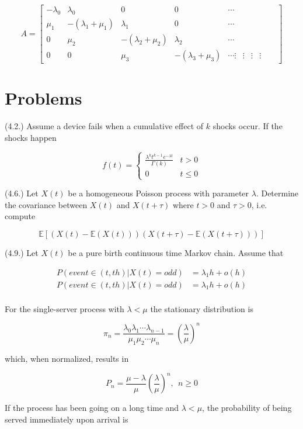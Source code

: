 \documentclass[12pt]{article}
\theoremstyle{nonumberbreak}
\begin{document}
$$
A = \begin{bmatrix}
-\lambda_0 & \lambda_0 & 0 & 0 & \cdots \\
\mu_1 & -(\lambda_1 + \mu_1)  & \lambda_1 & 0 & \cdots \\
0 & \mu_2 & -(\lambda_2 + \mu_2) & \lambda_2 & \cdots \\
0 & 0 & \mu_3 & -(\lambda_3 + \mu_3) & \cdots
\vdots & \vdots &  \vdots &  \vdots &   & 
\end{bmatrix}
$$


\section{Problems}

(4.2.) Assume a device fails when a cumulative effect of $k$ shocks occur. If the shocks happen 

$$
f(t) = \begin{cases}
\frac{\lambda^k t^{k-1} e^{-\lambda t}}{\Gamma(k)} & t>0 \\[8pt]
0 & t \le 0
\end{cases}
$$


(4.6.) Let $X(t)$ be a homogeneous Poisson process with parameter $\lambda$. Determine the covariance between $X(t)$ and $X(t + \tau)$ where $t > 0$ and $\tau > 0$, i.e. compute

$$
\mathbb{E} \left[ \left( X(t) - \mathbb{E}(X(t)) \right) \left( X(t+\tau) - \mathbb{E}(X(t+\tau)) \right) \right]
$$



(4.9.) Let $X(t)$ be a pure birth continuous time Markov chain. Assume that 

$$
\begin{aligned}
P(event \in (t, th) | X(t) = odd) &= \lambda_1 h + o(h) \\[8pt]
P(event \in (t, th) | X(t) = odd) &= \lambda_1 h + o(h) \\[8pt]
\end{aligned}
$$


For the single-server process with $\lambda < \mu$ the stationary distribution is 

$$
\pi_n = \frac{\lambda_0 \lambda_1 \cdots \lambda_{n-1} }{\mu_1 \mu_2 \cdots \mu_n} = (\frac{\lambda}{\mu})^n
$$

which, when normalized, results in

$$
P_n = \frac{\mu - \lambda}{\mu} (\frac{\lambda}{\mu})^n, \ \ n \ge 0
$$


If the process has been going on a long time and $\lambda < \mu$, the probability of being served immediately upon arrival is 
\end{document}
